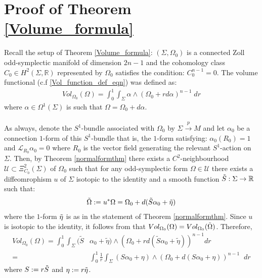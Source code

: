\documentclass[11pt]{amsart}
\theoremstyle{plain}
\theoremstyle{definition}
\theoremstyle{remark}
\begin{document}
\section{Proof of Theorem \ref{Volume_formula}}\label{vol_formula_section}
Recall the setup of Theorem \ref{Volume_formula}: $(\Sigma,\Omega_0)$ is a connected Zoll odd-symplectic manifold of dimension $2n-1$ and the cohomology class $C_0 \in H^2(\Sigma,\mathbb{R})$ represented by $\Omega_0$ satisfies the condition: $C_0^{n-1} =0$. The volume functional (c.f \eqref{Vol_function_def_eqn}) was defined as:
\begin{align}
  Vol_{\Omega_0}(\Omega) = \int^1_0 \int_{\Sigma} \alpha \wedge (\Omega_0+rd\alpha)^{n-1} \;dr
\end{align}
where $\alpha \in \Omega^1(\Sigma)$ is such that $\Omega = \Omega_0+d\alpha$.\\
\\
As always, denote the $S^1$-bundle associated with $\Omega_0$ by $\Sigma \xrightarrow{p} M$ and let $\alpha_0$ be a connection $1$-form of this $S^1$-bundle that is, the $1$-form satisfying: $\alpha_0 (R_0) =1$ and $\mathcal{L}_{R_0}\alpha_0 =0$ where $R_0$ is the vector field generating the relevant $S^1$-action on $\Sigma$. Then, by Theorem \ref{normalformthm} there exists a $C^2$-neighbourhood $\mathcal{U} \subset \Xi^2_{C_0}(\Sigma)$ of $\Omega_0$ such that for any odd-symplectic form $\Omega \in \mathcal{U}$ there exists a diffeomrophism $u$ of $\Sigma$ isotopic to the identity and a smooth function $\Tilde{S}: \Sigma \rightarrow \mathbb{R}$ such that:
\begin{align}
    \Tilde{\Omega}:= u^*\Omega = \Omega_0 + d(\Tilde{S}\alpha_0 + \Tilde{\eta}) 
\end{align}
where the $1$-form $\Tilde{\eta}$ is as in the statement of Theorem \ref{normalformthm}. Since $u$ is isotopic to the identity, it follows from \cite[Proposition 2.8]{B-K-Odd_Symp} that $Vol_{\Omega_0}(\Omega) = Vol_{\Omega_0}(\Tilde{\Omega})$. Therefore,
\begin{align}\label{raw_vol_integral_vol_formula_compuattion}
Vol_{\Omega_0}(\Omega) =    \int^1_0 \int_{\Sigma} (\tilde{S}&\alpha_0 + \tilde{\eta} ) \wedge (\Omega_0 + r d(\tilde{S}\alpha_0 + \tilde{\eta}))^{n-1} dr \\\nonumber = &\int^1_0 \frac{1}{r} \int_{\Sigma}  (S\alpha_0 +\eta) \wedge (\Omega_0 + d(S\alpha_0 +\eta))^{n-1} \;\; dr
\end{align}
where $S:= r \Tilde{S}$ and $\eta:= r \Tilde{\eta}$.\\
\end{document}
